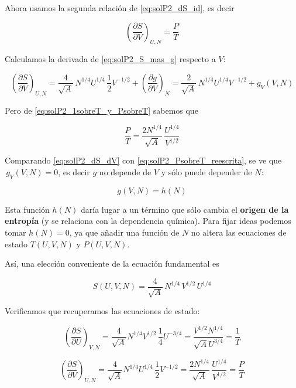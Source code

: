 \documentclass{article}
\begin{document}
Ahora usamos la segunda relación de \eqref{eq:solP2_dS_id}, es decir

\[
\left(\frac{\partial S}{\partial V}\right)_{U,N}
= \frac{P}{T}
\]

Calculamos la derivada de \eqref{eq:solP2_S_mas_g} respecto a \(V\):

\begin{equation}
\left(\frac{\partial S}{\partial V}\right)_{U,N}
= \frac{4}{\sqrt{A}}\,N^{1/4}U^{1/4}\,\frac{1}{2}V^{-1/2}
  + \left(\frac{\partial g}{\partial V}\right)_{N}
= \frac{2}{\sqrt{A}}\,N^{1/4}U^{1/4}V^{-1/2}
  + g_{V}(V,N)
\label{eq:solP2_dS_dV}
\end{equation}

Pero de \eqref{eq:solP2_1sobreT_y_PsobreT} sabemos que

\begin{equation}
\frac{P}{T}
= \frac{2N^{1/4}}{\sqrt{A}}\,\frac{U^{1/4}}{V^{1/2}}
\label{eq:solP2_PsobreT_reescrita}
\end{equation}

Comparando \eqref{eq:solP2_dS_dV} con \eqref{eq:solP2_PsobreT_reescrita}, se ve que
\(\,g_{V}(V,N)=0\), es decir \(g\) no depende de \(V\) y sólo puede depender de \(N\):

\[
g(V,N) = h(N)
\]

Esta función \(h(N)\) daría lugar a un término que sólo cambia el
\textcolor{vividviolet}{\textbf{origen de la entropía}} (y se relaciona con la dependencia química).
Para fijar ideas podemos tomar \(h(N)=0\), ya que añadir una función de \(N\) no altera
las ecuaciones de estado \(T(U,V,N)\) y \(P(U,V,N)\).

Así, una elección conveniente de la ecuación fundamental es

\begin{equation}
\boxed{
S(U,V,N)
= \frac{4}{\sqrt{A}}\,N^{1/4}\,V^{1/2}\,U^{1/4}
}
\label{eq:solP2_fundamental}
\end{equation}


Verificamos que recuperamos las ecuaciones de estado:

\[
\left(\frac{\partial S}{\partial U}\right)_{V,N}
= \frac{4}{\sqrt{A}}N^{1/4}V^{1/2}\,\frac{1}{4}U^{-3/4}
= \frac{V^{1/2}N^{1/4}}{\sqrt{A}U^{3/4}}
= \frac{1}{T}
\]

\[
\left(\frac{\partial S}{\partial V}\right)_{U,N}
= \frac{4}{\sqrt{A}}N^{1/4}U^{1/4}\,\frac{1}{2}V^{-1/2}
= \frac{2N^{1/4}}{\sqrt{A}}\,\frac{U^{1/4}}{V^{1/2}}
= \frac{P}{T}
\]
\end{document}
